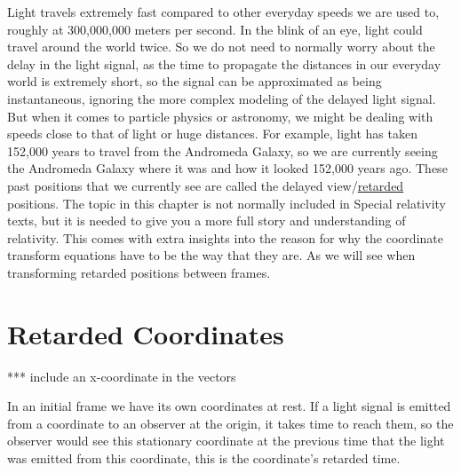Light travels extremely fast compared to other everyday speeds we are used to, roughly at 300,000,000 meters per second.
In the blink of an eye, light could travel around the world twice.
So we do not need to normally worry about the delay in the light signal, as the time to propagate the distances in our everyday world is extremely short, so the signal can be approximated as being instantaneous, ignoring the more complex modeling of the delayed light signal.
But when it comes to particle physics or astronomy, we might be dealing with speeds close to that of light or huge distances.
For example, light has taken 152,000 years to travel from the Andromeda Galaxy, so we are currently seeing the Andromeda Galaxy where it was and how it looked 152,000 years ago.
These past positions that we currently see are called the delayed view/\hyperlink{def-retarded-position}{retarded} positions.
The topic in this chapter is not normally included in Special relativity texts, but it is needed to give you a more full story and understanding of relativity.
This comes with extra insights into the reason for why the coordinate transform equations have to be the way that they are.
As we will see when transforming retarded positions between frames.

\section{Retarded Coordinates} \label{sect: Retarded Coordinates}

*** include an x-coordinate in the vectors

In an initial frame we have its own coordinates at rest.
If a light signal is emitted from a coordinate to an observer at the origin, it takes time to reach them, so the observer would see this stationary coordinate at the previous time that the light was emitted from this coordinate, this is the coordinate's retarded time.


